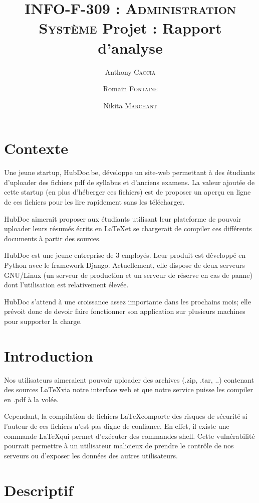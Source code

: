\documentclass[10pt,a4paper]{article}
\author{Anthony \textsc{Caccia} \and Romain \textsc{Fontaine} \and Nikita \textsc{Marchant} }
\date{}
\title{\textsc{INFO-F-309 : Administration Système} Projet : Rapport d'analyse}
\begin{document}
\maketitle

\section{Contexte}

Une jeune startup, HubDoc.be, développe un site-web permettant à des étudiants d'uploader des fichiers pdf de syllabus et d'anciens examens.
La valeur ajoutée de cette startup (en plus d'héberger ces fichiers) est de proposer un aperçu en ligne de ces fichiers pour les lire rapidement sans les télécharger.

HubDoc aimerait proposer aux étudiants utilisant leur plateforme de pouvoir uploader leurs résumés écrits en \LaTeX et se chargerait de compiler ces différents documents à partir des sources.

HubDoc est une jeune entreprise de 3 employés.
Leur produit est développé en Python avec le framework Django.
Actuellement, elle dispose de deux serveurs GNU/Linux (un serveur de production et un serveur de réserve en cas de panne) dont l'utilisation est relativement élevée.

HubDoc s'attend à une croissance assez importante dans les prochains mois;
elle prévoit donc de devoir faire fonctionner son application sur plusieurs machines pour supporter la charge.


\section{Introduction}

Nos utilisateurs aimeraient pouvoir uploader des archives (.zip, .tar, ..) contenant des sources \LaTeX via notre interface web et que notre service puisse les compiler en .pdf à la volée.

Cependant, la compilation de fichiers \LaTeX comporte des risques de sécurité si l'auteur de ces fichiers n'est pas digne de confiance.
En effet, il existe une commande \LaTeX qui permet d'exécuter des commandes shell.
Cette vulnérabilité pourrait permettre à un utilisateur malicieux de prendre le contrôle de nos serveurs ou d'exposer les données des autres utilisateurs.

\section{Descriptif}
\end{document}
